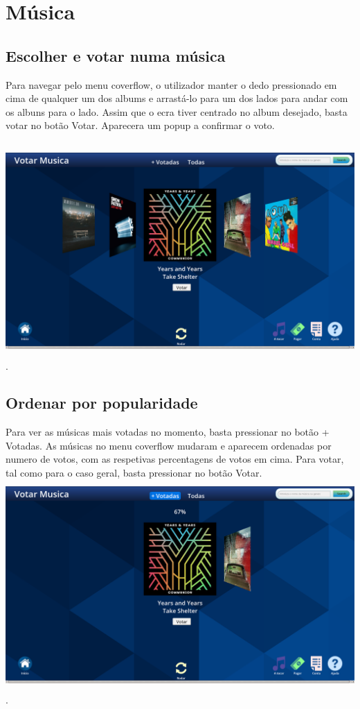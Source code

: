 \documentclass{article}
\begin{document}
\section{Música}
\subsection{Escolher e votar numa música}
Para navegar pelo menu coverflow, o utilizador manter o dedo pressionado em cima de qualquer um dos albums e arrastá-lo para um dos lados para andar com os albuns para o lado. Assim que o ecra tiver centrado no album desejado, basta votar no botão Votar. Aparecera um popup a confirmar o voto.\\\\
\includegraphics[width=15cm, height=8cm]{user_manual_images/vote_menu.png}.
\subsection{Ordenar por popularidade}
Para ver as músicas mais votadas no momento, basta pressionar no botão + Votadas. As músicas no menu coverflow mudaram e aparecem ordenadas por numero de votos, com as respetivas percentagens de votos em cima. Para votar, tal como para o caso geral, basta pressionar no botão Votar.\\
\includegraphics[width=15cm, height=8cm]{user_manual_images/most_voted.png}.
\end{document}
